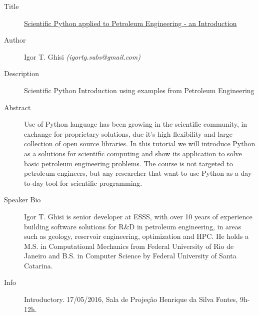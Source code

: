 \begin{description}
   \item[Title] \underline{Scientific Python applied to Petroleum Engineering - an Introduction}
   \item[Author] Igor T. Ghisi \emph{(igortg.subs@gmail.com)}
   \item[Description] Scientific Python Introduction using examples from Petroleum Engineering 
   \item[Abstract] Use of Python language has been growing in the scientific community, in exchange for proprietary solutions, due it's high flexibility and large collection of open source libraries. In this tutorial we will introduce Python as a solutions for scientific computing and show its application to solve basic petroleum engineering problems. The course is not targeted to petroleum engineers, but any researcher that want to use Python as a day-to-day tool for scientific programming.
    \item[Speaker Bio] Igor T. Ghisi is senior developer at ESSS, with over 10 years of experience building software solutions for R\&D in petroleum engineering, in areas such as geology, reservoir engineering, optimization and HPC. He holds a M.S. in Computational Mechanics from Federal University of Rio de Janeiro and B.S. in Computer Science by Federal University of Santa Catarina.
    \item[Info] Introductory. 17/05/2016, Sala de Projeção Henrique da Silva Fontes, 9h-12h.
\end{description} 
